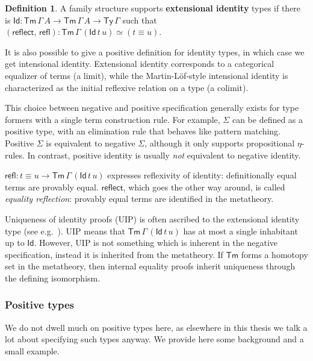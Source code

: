 \documentclass[12pt,a4paper,twoside,openany]{book}
\theoremstyle{remark}
\theoremstyle{definition}
\newtheorem{mydefinition}{Definition}
\theoremstyle{theorem}
\newcommand{\refl}{\mathsf{refl}}
\newcommand{\reflect}{\mathsf{reflect}}
\newcommand{\Tm}{\mathsf{Tm}}
\newcommand{\Ty}{\mathsf{Ty}}
\newcommand{\Id}{\mathsf{Id}}
\begin{document}
\begin{mydefinition}
A family structure supports \textbf{extensional identity} types if there is $\Id
: \Tm\,\Gamma\,A \to \Tm\,\Gamma\,A \to \Ty\,\Gamma$ such that
$(\reflect,\,\refl) : \Tm\,\Gamma\,(\Id\,t\,u) \simeq (t \equiv u)$.
\end{mydefinition}

It is also possible to give a positive definition for identity types, in which
case we get intensional identity. Extensional identity corresponds to a
categorical equalizer of terms (a limit), while the Martin-Löf-style intensional
identity is characterized as the initial reflexive relation on a type (a
colimit).

This choice between negative and positive specification generally exists for
type formers with a single term construction rule. For example, $\Sigma$ can be
defined as a positive type, with an elimination rule that behaves like pattern
matching. Positive $\Sigma$ is equivalent to negative $\Sigma$, although it only
supports propositional $\eta$-rules. In contrast, positive identity is usually
\emph{not} equivalent to negative identity.

$\refl : t \equiv u \to \Tm\,\Gamma\,(\Id\,t\,u)$ expresses reflexivity of
identity: definitionally equal terms are provably equal. $\reflect$, which goes
the other way around, is called \emph{equality reflection}: provably equal terms
are identified in the metatheory.

Uniqueness of identity proofs (UIP) is often ascribed to the extensional
identity type (see e.g.\ \cite{hofmann1995extensional}). UIP means that
$\Tm\,\Gamma\,(\Id\,t\,u)$ has at most a single inhabitant up to $\Id$. However,
UIP is not something which is inherent in the negative specification, instead it
is inherited from the metatheory. If $\Tm$ forms a homotopy set in the
metatheory, then internal equality proofs inherit uniqueness through the
defining isomorphism.

\subsubsection{Positive types}

We do not dwell much on positive types here, as elsewhere in this thesis we talk
a lot about specifying such types anyway. We provide here some background and
a small example.
\end{document}
